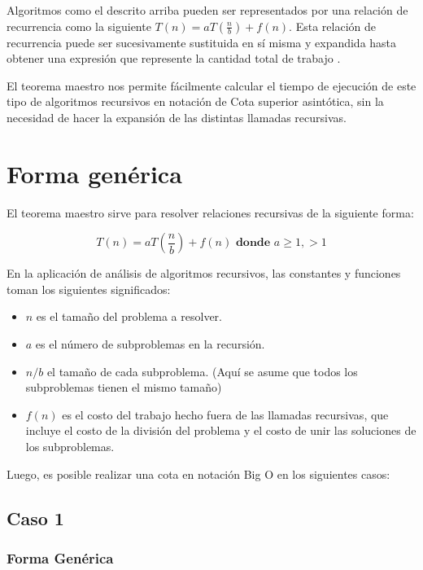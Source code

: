 \documentclass[12pt, letterpaper]{article} %
\begin{document}
Algoritmos como el descrito arriba pueden ser representados por una relación de recurrencia como la siguiente $T(n)=aT(\frac{n}{b})+f(n)$. Esta relación de recurrencia puede ser sucesivamente sustituida en sí misma y expandida hasta obtener una expresión que represente la cantidad total de trabajo \cite{duke}.\\
\vspace{1mm}

El teorema maestro nos permite fácilmente calcular el tiempo de ejecución de este tipo de algoritmos recursivos en notación de Cota superior asintótica, sin la necesidad de hacer la expansión de las distintas llamadas recursivas.\\

\section{Forma genérica}
El teorema maestro sirve para resolver relaciones recursivas de la siguiente forma:

\begin{equation}
    T(n)=aT\left({\frac {n}{b}}\right)+f(n) \textbf{ donde } a\geq 1,>1
\end{equation}

En la aplicación de análisis de algoritmos recursivos, las constantes y funciones toman los siguientes significados:

\begin{itemize}
    \item $n$ es el tamaño del problema a resolver.
    \item $a$ es el número de subproblemas en la recursión.
    \item $n/b$ el tamaño de cada subproblema. (Aquí se asume que todos los subproblemas tienen el mismo tamaño)
    \item $f(n)$ es el costo del trabajo hecho fuera de las llamadas recursivas, que incluye el costo de la división del problema y el costo de unir las soluciones de los subproblemas.

\end{itemize}
Luego, es posible realizar una cota en notación Big O en los siguientes casos:\\

\subsection{Caso 1}
\subsubsection{Forma Genérica}
\end{document}
